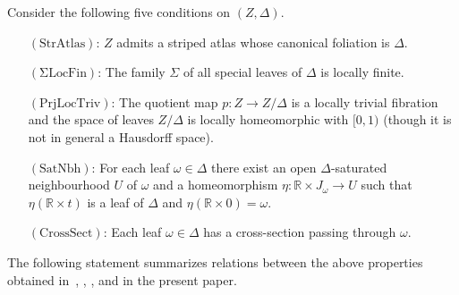 \documentclass[12pt, reqno]{amsart}
\newcommand{\bR}{\mathbb{R}}
\newcommand\Usp{U}
\newcommand{\Partition}{\Delta}
\newcommand{\leaf}{\omega}
\newcommand{\stripSurf}{Z}
\newcommand\JL{J_{\leaf}}
\begin{document}
\newcommand\condLF{\mathrm{(\Sigma LocFin)}}
\newcommand\condU{\mathrm{(SatNbh)}}
\newcommand\condCR{\mathrm{(CrossSect)}}
\newcommand\condST{\mathrm{(StrAtlas)}}
\newcommand\condLT{\mathrm{(PrjLocTriv)}}


Consider the following five conditions on $(\stripSurf,\Partition)$.

\begin{enumerate}[leftmargin=8ex, itemsep=1ex, align=left]
\item[$\condST$:]
$\stripSurf$ admits a striped atlas whose canonical foliation is $\Partition$.

\item[$\condLF$:]
The family $\Sigma$ of all special leaves of $\Partition$ is locally finite.

\item[$\condLT$:]
The quotient map $p:\stripSurf\to\stripSurf/\Partition$ is a locally trivial fibration and the space of leaves $\stripSurf/\Partition$ is locally homeomorphic with $[0,1)$ (though it is not in general a Hausdorff space).

\item[$\condU$:]
For each leaf $\leaf\in\Partition$ there exist an open $\Partition$-saturated neighbourhood $\Usp$ of $\omega$ and a homeomorphism $\eta: \bR\times \JL \to \Usp$ such that $\eta(\bR\times t)$ is a leaf of $\Partition$ and $\eta(\bR\times 0) = \omega$.

\item[$\condCR$:]
Each leaf $\leaf\in\Partition$ has a cross-section passing through $\leaf$.
\end{enumerate}

The following statement summarizes relations between the above properties obtained in~\cite{MaksymenkoPolulyakh:PGC:2015}, \cite{MaksymenkoPolulyakh:MFAT:2016}, \cite{MaksymenkoPolulyakh:PGC:2016}, and in the present paper.
\end{document}
